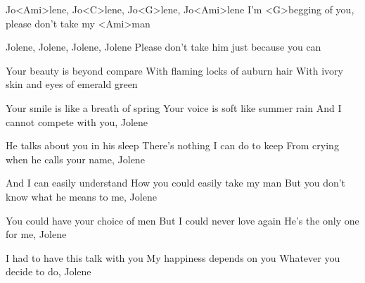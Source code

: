 

\zr
Jo<Ami>lene, Jo<C>lene, Jo<G>lene, Jo<Ami>lene
I'm <G>begging of you, please don't take my <Ami>man

Jolene, Jolene, Jolene, Jolene
Please don't take him just because you can
\kr

\zs
Your beauty is beyond compare
With flaming locks of auburn hair
With ivory skin and eyes of emerald green

Your smile is like a breath of spring
Your voice is soft like summer rain
And I cannot compete with you, Jolene
\ks

\zs
He talks about you in his sleep
There's nothing I can do to keep
From crying when he calls your name, Jolene

And I can easily understand
How you could easily take my man
But you don't know what he means to me, Jolene
\ks

\zr\kr

\zs
You could have your choice of men
But I could never love again
He's the only one for me, Jolene

I had to have this talk with you
My happiness depends on you
Whatever you decide to do, Jolene
\ks

\zr\kr

\kp
